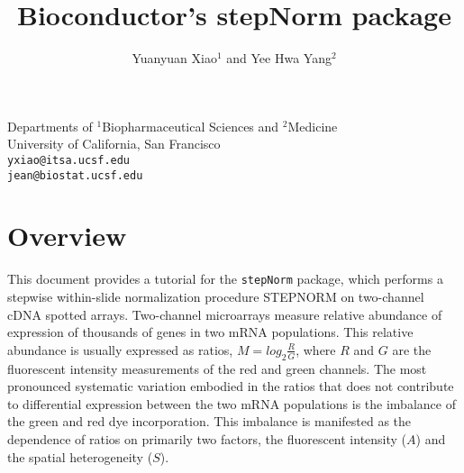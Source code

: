 \documentclass[11pt]{article}
\newcommand{\code}[1]{{\tt #1}}
\begin{document}
\newcommand{\myincfig}[3]{%
  \begin{figure}[htbp]
    \begin{center}
      \texttt{[image: \#1]}
      \caption{\label{#1}#3}
    \end{center}
  \end{figure}
}


\title{\bf Bioconductor's stepNorm package}

\author{Yuanyuan Xiao$^1$ and Yee Hwa Yang$^2$}

\maketitle


\begin{center}
Departments of $^1$Biopharmaceutical Sciences and $^2$Medicine \\
University of California, San Francisco\\ 
{\tt yxiao@itsa.ucsf.edu}\\
{\tt jean@biostat.ucsf.edu}
\end{center}



\tableofcontents


\section{Overview}

This document provides a tutorial for the \code{stepNorm} package, which performs a 
stepwise within-slide normalization procedure STEPNORM on two-channel cDNA spotted arrays. 
Two-channel microarrays measure relative abundance of expression of thousands of genes 
in two mRNA populations. This relative abundance is usually expressed as ratios, 
$M = log_{2}\frac{R}{G}$, where $R$ and $G$ are the fluorescent intensity measurements 
of the red and green channels. The most pronounced systematic variation embodied in the 
ratios that does not contribute to differential expression between the two mRNA populations 
is the imbalance of the green and red dye incorporation. This imbalance is manifested as the 
dependence of ratios on primarily two factors, the fluorescent intensity ($A$) and the 
spatial heterogeneity ($S$).\\
\end{document}
